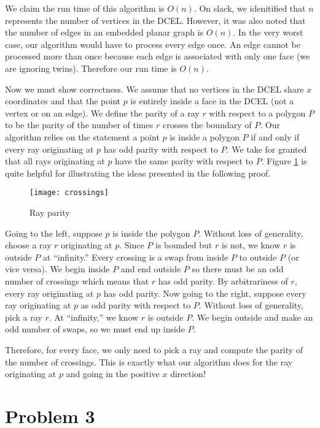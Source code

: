 \documentclass[11pt]{article}
\begin{document}
We claim the run time of this algorithm is $O(n)$.
On slack, we idenitified that $n$ represents the number of vertices in the DCEL.
However, it was also noted that the number of edges in an embedded planar graph is $O(n)$.
In the very worst case, our algorithm would have to process every edge once.
An edge cannot be processed more than once because each edge is associated with only one face (we are ignoring twins).
Therefore our run time is $O(n)$.

Now we must show correctness.
We assume that no vertices in the DCEL share $x$ coordinates and that the point $p$ is entirely inside a face in the DCEL (not a vertex or on an edge).
We define the parity of a ray $r$ with respect to a polygon $P$ to be the parity of the number of times $r$ crosses the boundary of $P$.
Our algorithm relies on the statement a point $p$ is inside a polygon $P$ if and only if every ray originating at $p$ has odd parity with respect to $P$.
We take for granted that all rays originating at $p$ have the same parity with respect to $P$.
Figure \ref{fig:crossings} is quite helpful for illustrating the ideas presented in the following proof.

\begin{figure}[h]
   \centering
   \texttt{[image: crossings]}
   \caption{Ray parity}
   \label{fig:crossings}
\end{figure}

Going to the left, suppose $p$ is inside the polygon $P$.
Without loss of generality, choose a ray $r$ originating at $p$.
Since $P$ is bounded but $r$ is not, we know $r$ is outside $P$ at ``infinity.''
Every crossing is a swap from inside $P$ to outside $P$ (or vice versa).
We begin inside $P$ and end outside $P$ so there must be an odd number of crossings which means that $r$ has odd parity.
By arbitrariness of $r$, every ray originating at $p$ has odd parity.
Now going to the right, suppose every ray originating at $p$ as odd parity with respect to $P$.
Without loss of generality, pick a ray $r$.
At ``infinity,'' we know $r$ is outside $P$.
We begin outside and make an odd number of swaps, so we must end up inside $P$.

Therefore, for every face, we only need to pick a ray and compute the parity of the number of crossings.
This is exactly what our algorithm does for the ray originating at $p$ and going in the positive $x$ direction!

\newpage
\section*{Problem 3}
\end{document}

